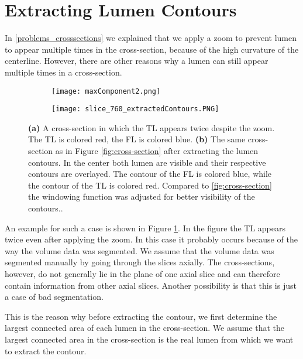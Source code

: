 \documentclass[thesis.tex]{subfiles}
\begin{document}
\section{Extracting Lumen Contours}
\label{section:extracting_contours}
In \ref{problems_crosssections} we explained that we apply a zoom to prevent lumen to appear multiple times in the cross-section, because of the high curvature of the centerline. However, there are other reasons why a lumen can still appear multiple times in a cross-section. 

\begin{figure}
\centering
	\begin{subfigure}[t]{0.454\textwidth}
		\texttt{[image: maxComponent2.png]}
		\caption{}	
		\label{maxComponent}	
	\end{subfigure}
\hspace{0.13\textwidth}
	\begin{subfigure}[t]{0.4\textwidth}
		\texttt{[image: slice\_760\_extractedContours.PNG]}
		
	\caption{}	
\label{fig:extracted_contours}	
	\end{subfigure}

	\caption{\textbf{(a)} A cross-section in which the TL appears twice despite the zoom. The TL is colored red, the FL is colored blue. \textbf{(b)} The same cross-section as in Figure \ref{fig:cross-section} after extracting the lumen contours. In the center both lumen are visible and their respective contours are overlayed. The contour of the FL is colored blue, while the contour of the TL is colored red. Compared to \ref{fig:cross-section} the windowing function was adjusted for better visibility of the contours..}
\label{fig:overlapping}
\end{figure}

An example for such a case is shown in Figure \ref{maxComponent}. In the figure the TL appears twice even after applying the zoom. In this case it probably occurs because of the way the volume data was segmented. We assume that the volume data was segmented manually by going through the slices axially. The cross-sections, however, do not generally lie in the plane of one axial slice and can therefore contain information from other axial slices. Another possibility is that this is just a case of bad segmentation.

This is the reason why before extracting the contour, we first determine the largest connected area of each lumen in the cross-section. We assume that the largest connected area in the cross-section is the real lumen from which we want to extract the contour. 
\end{document}
